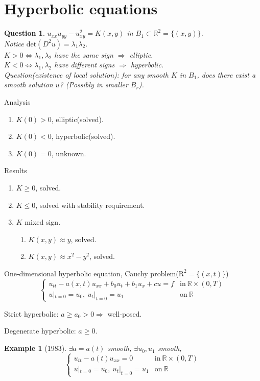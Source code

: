 \documentclass[12pt]{article}
\newtheorem{example}{Example}
\newtheorem{question}{Question}
\begin{document}
\newpage
\section{Hyperbolic equations}
\begin{question}
$u_{xx}u_{yy}-u_{xy}^2=K(x,y)$ in $B_1\subset\mathbb{R}^2=\{(x,y) \}$. \\
Notice $\mathrm{det}\left(D^2u\right)=\lambda_1\lambda_2. $\\
$K>0\iff\lambda_1,\lambda_2$ have the same sign $\Rightarrow$ elliptic.\\
$K<0\iff\lambda_1,\lambda_2$ have different signs $\Rightarrow$ hyperbolic.\\
Question(existence of local solution): for any smooth $K$ in $B_1$, does there exist a smooth solution $u$? (Possibly in smaller $B_r$). 
\end{question}

Analysis
\begin{enumerate}
\item $K(0)>0$, elliptic(solved).
\item $K(0)<0$, hyperbolic(solved).
\item $K(0)=0$, unknown.
\end{enumerate}

Results
\begin{enumerate}
	\item $K\ge0$, solved.
	\item $K\le0$, solved with stability requirement.
	\item $K$ mixed sign.
	\begin{enumerate}
	\item $K(x,y)\approx y$, solved.
	\item $K(x,y)\approx x^2-y^2$, solved.
	\end{enumerate}
\end{enumerate}

One-dimensional hyperbolic equation, Cauchy problem($\mathrm{R}^2=\{(x,t) \} $)
\begin{equation*}
\begin{cases}
u_{tt}-a(x,t)u_{xx}+b_0u_t+b_1u_x+cu=f & \mathrm{in\ } \mathbb{R}\times(0,T)\\
u|_{t=0}=u_0,\ u_t|_{t=0}=u_1 & \mathrm{on\ } \mathbb{R}
\end{cases}
\end{equation*}

Strict hyperbolic: $a\ge a_0>0\Rightarrow $ well-posed.

Degenerate hyperbolic: $a\ge0 $.
\begin{example}[1983]
$\exists a=a(t) $ smooth, $\exists u_0, u_1 $ smooth,
\begin{equation*}
	\begin{cases}
	u_{tt}-a(t)u_{xx}=0 & \mathrm{in\ }\mathbb{R}\times(0,T)\\
	u|_{t=0}=u_0,\ u_t|_{t=0}=u_1 & \mathrm{on\ } \mathbb{R}
	\end{cases}
\end{equation*}
\end{example}
\end{document}
